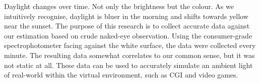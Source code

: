 Daylight changes over time. Not only the brightness but the colour. As we intuitively recognise, daylight is bluer in the morning and shifts towards yellow near the sunset. The purpose of this research is to collect accurate data against our estimation based on crude naked-eye observation. Using the consumer-grade spectrophotometer facing against the white surface, the data were collected every minute. The resulting data somewhat correlates to our common sense, but it was not static at all. These data can be used to accurately simulate an ambient light of real-world within the virtual environment, such as CGI and video games.
